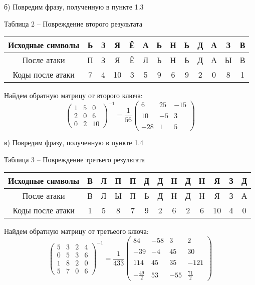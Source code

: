 \documentclass[a5paper, 10pt]{article}
\theoremstyle{definition}
\theoremstyle{plain}
\theoremstyle{remark}
\begin{document}
 б) Повредим фразу, полученную в пункте 1.3
\begin{center}
Таблица 2 -- Повреждение  второго результата\\
\begin{tabular}{ |c|c|c|c|c|c|c|c|c|c|c|c|c| } 
 \hline
Исходные символы & Ь & З & Я & Ё & А  & Ь & Н  & Ь & Д  & А & З  & В\\
\hline
После атаки & П & З & Я & Ё & Л  & Ь & Н  & Ь & Д  & А & Ы  & В \\
 \hline
Коды после атаки & 7 & 4 & 10 & 3 & 5  & 9 & 6  & 9 & 2  & 0 & 8  & 1  \\
 \hline
\end{tabular}
\end{center}
Найдем обратную матрицу от второго ключа:
\begin{equation}
\begin{pmatrix}
 1 & 5 & 0\\
 2 & 0 & 6 \\
 0 & 2 & 10
\end{pmatrix}^{-1}
 = 
 \frac{1}{56}\begin{pmatrix}
 6 & 25 & -15\\
\\
 10 & -5 & 3 \\
\\
 -28 & 1 & 5
\end{pmatrix}
\end{equation}


 в) Повредим фразу, полученную в пункте 1.4
\begin{center}
Таблица 3 -- Повреждение третьего результата\\
\begin{tabular}{ |c|c|c|c|c|c|c|c|c|c|c|c|c| } 
 \hline
Исходные символы & В & Л & П & П & Д  & Д & Н  & Д & Н  & Я & З  & Д\\
\hline
После атаки  & В & Л & Ы & П & Ь  & Д & Н  & Д & Н  & Я & З  & А \\
 \hline
Коды после атаки & 1 & 5 & 8 & 7 & 9  & 2 & 6  & 2 & 6  & 10 & 4  & 0  \\
 \hline
\end{tabular}
\end{center}
Найдем обратную матрицу от третьеого ключа:
\begin{equation}
\begin{pmatrix}
 5 & 3 & 2 & 4 \\
 0 & 5 & 3 & 6 \\
1& 8 & 2 & 0\\
 5 & 7 & 0 & 6
\end{pmatrix}^{-1}
=  \frac{1}{433}\begin{pmatrix}
  84 & -58 & 3 & 2 \\
\\
 -39 & -4 & 45 & 30 \\
\\
114 & 45 & 35 & -121\\
\\
 - \frac{49}{2} & 53 & -55 &  \frac{71}{2}
\end{pmatrix}
\end{equation}
\end{document}
